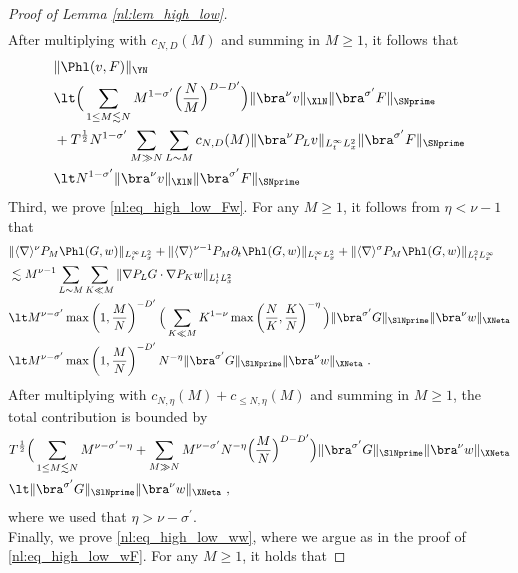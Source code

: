 \documentclass[11pt]{article}
\begin{document}
\begin{proof}[Proof of Lemma \ref{nl:lem_high_low}]
\begin{align*}
\end{align*}
After multiplying with \( c_{N,D}(M) \) and summing in \( M \geq 1 \), it follows that 
\begin{align*}
&\|  \Phl(v,F) \|_{\YN} \\
&\lt \Big( \sum_{1\leq M\lesssim N} M^{1-\sigma^\prime} \Big( \frac{N}{M} \Big)^{D-D^\prime} \Big)  \| \bra^\nu  v \|_{\XlN} \| \bra^{\sigma^\prime} F \|_{\SNprime}\\
 &+ T^{\frac{1}{2}}N^{1-\sigma^\prime} \sum_{M\gg N} \sum_{L\sim M} c_{N,D}(M)  \| \bra^\nu P_L v \|_{L_t^\infty L_x^2}  \| \bra^{\sigma^\prime} F \|_{\SNprime} \\
 &\lt  N^{1-\sigma^\prime} \| \bra^\nu  v \|_{\XlN} \| \bra^{\sigma^\prime} F \|_{\SNprime}
\end{align*}
Third, we prove \eqref{nl:eq_high_low_Fw}. For any \( M \geq 1 \), it follows from \( \eta < \nu-1 \) that
\begin{align*}
&\| \langle \nabla \rangle^{\nu} P_M \Phl(G,w) \|_{L_t^\infty L_x^2} +\| \langle \nabla \rangle^{\nu-1}  P_M \partial_t \Phl(G,w) \|_{L_t^\infty L_x^2} + \| \langle \nabla \rangle^{\sigma} P_M \Phl(G,w) \|_{L_t^2 L_x^\infty}\\
&\lesssim M^{\nu-1} \sum_{L\sim M} \sum_{K\ll M} \| \nabla P_L G \cdot \nabla P_K w \|_{L_t^1 L_x^2} \\
&\lt M^{\nu-\sigma^\prime} \max\left( 1, \frac{M}{N} \right)^{-D^\prime}  \Big( \sum_{K\ll M} K^{1-\nu} \max\left( \frac{N}{K}, \frac{K}{N} \right)^{-\eta} \Big) \| \bra^{\sigma^\prime} G \|_{\SlNprime} \| \bra^\nu w \|_{\XNeta} \\
&\lt M^{\nu-\sigma^\prime} \max\left( 1, \frac{M}{N} \right)^{-D^\prime} N^{-\eta} \| \bra^{\sigma^\prime} G \|_{\SlNprime} \| \bra^\nu w \|_{\XNeta}~. 
\end{align*}
After multiplying with \( c_{N,\eta}(M) + c_{\leq N,\eta}(M) \) and summing in \( M \geq 1 \), the total contribution is bounded by 
\begin{align*}
&T^{\frac{1}{2}} \Big( \sum_{1\leq M\lesssim N} M^{\nu-\sigma^\prime-\eta} + \sum_{M\gg N} M^{\nu-\sigma^\prime} N^{-\eta} \Big( \frac{M}{N} \Big)^{D-D^\prime} \Big) \| \bra^{\sigma^\prime} G \|_{\SlNprime} \| \bra^\nu w \|_{\XNeta} \\
&\lt  \| \bra^{\sigma^\prime} G \|_{\SlNprime} \| \bra^\nu w \|_{\XNeta}~,
\end{align*}
where we used that \( \eta > \nu - \sigma^\prime \). \\
Finally, we prove \eqref{nl:eq_high_low_ww}, where we argue as in the proof of \eqref{nl:eq_high_low_wF}. For any \( M \geq 1 \), it holds that

\end{proof}
\end{document}
